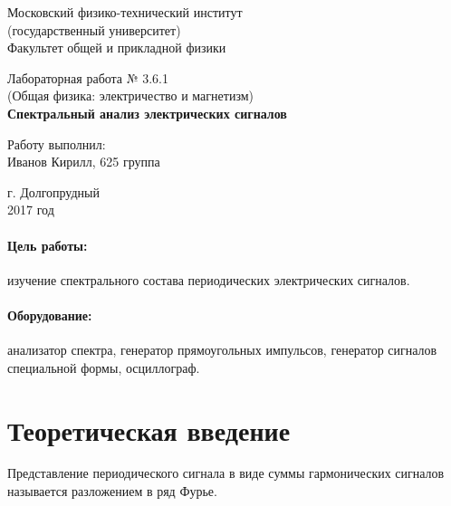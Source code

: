 \documentclass[12pt]{kiarticle}
\begin{document}
	
	\begin{titlepage}
	\begin{center}
		\large 	Московский физико-технический институт \\
		(государственный университет) \\
		Факультет общей и прикладной физики \\
		\vspace{0.2cm}
		
		\vspace{4.5cm}
		Лабораторная работа № 3.6.1 \\ \vspace{0.2cm}
		\large (Общая физика: электричество и магнетизм) \\ \vspace{0.2cm}
		\LARGE \textbf{Спектральный анализ электрических сигналов}
	\end{center}
	\vspace{2.3cm} \large
	
	\begin{center}
		Работу выполнил: \\
		Иванов Кирилл,
		625 группа
		\vspace{10mm}		
		
	\end{center}
	
	\begin{center} \vspace{60mm}
		г. Долгопрудный \\
		2017 год
	\end{center}
\end{titlepage}
	
	\paragraph*{Цель работы:} изучение спектрального состава периодических электрических сигналов.
	
	\paragraph*{Оборудование:} анализатор спектра, генератор прямоугольных импульсов, генератор сигналов специальной формы, осциллограф.
	
	\section{Теоретическая введение}
	
	Представление периодического сигнала в виде суммы гармонических сигналов называется разложением в ряд Фурье.
	
\end{document}
